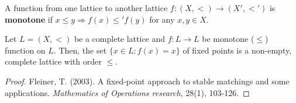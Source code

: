 \documentclass[11pt]{elegantbook}
\begin{document}
\begin{definition}
    \normalfont
    A function from one lattice to another lattice $f:(X,<) \rightarrow (X',<')$ is \textbf{monotone} if $x\leq y \Rightarrow f(x)\leq' f(y)$ for any $x,y\in X$.
\end{definition}

\begin{theorem}[Tarski 1955]
    Let $L=(X,<)$ be a complete lattice and $f: L \rightarrow L$ be monotone ($\leq$) function on $L$. Then, the set $\{x\in L: f(x)=x\}$ of fixed points is a non-empty, complete lattice with order $\leq$.
\end{theorem}
\begin{proof}
    Fleiner, T. (2003). A fixed-point approach to stable matchings and some applications. \textit{Mathematics of Operations research}, 28(1), 103-126.
\end{proof}












\end{document}
